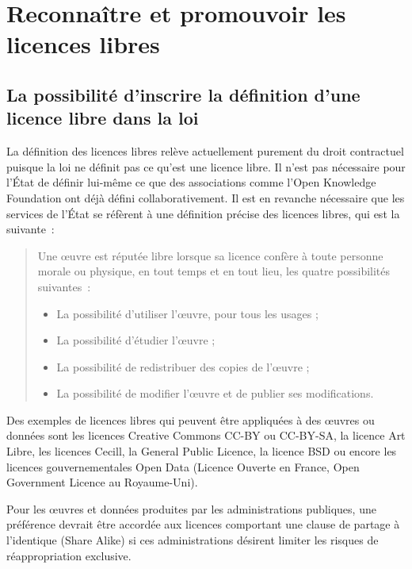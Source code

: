 \chapter{Reconnaître et promouvoir les licences libres}\label{licencelibre}

\section{La possibilité d'inscrire la définition d'une licence libre dans la loi}
La définition des licences libres relève actuellement purement du droit contractuel puisque la loi ne définit pas ce qu'est une licence libre. Il n'est pas nécessaire pour l'État de définir lui-même ce que des associations comme l'Open Knowledge Foundation ont déjà défini collaborativement. Il est en revanche nécessaire que les services de l'État se réfèrent à une définition précise des licences libres, qui est la suivante~:

\begin{quotation}
Une œuvre est réputée libre lorsque sa licence confère à toute personne morale ou physique, en tout temps et en tout lieu, les quatre possibilités suivantes~:
\begin{itemize}
\item La possibilité d'utiliser l'œuvre, pour tous les usages ;
\item La possibilité d'étudier l'œuvre ;
\item La possibilité de redistribuer des copies de l'œuvre ;
\item La possibilité de modifier l'œuvre et de publier ses modifications.
\end{itemize}
\end{quotation}

Des exemples de licences libres qui peuvent être appliquées à des œuvres ou données sont les licences Creative Commons CC-BY ou CC-BY-SA, la licence Art Libre, les licences Cecill, la General Public Licence, la licence BSD ou encore les licences gouvernementales Open Data (Licence Ouverte en France, Open Government Licence au Royaume-Uni). 

Pour les œuvres et données produites par les administrations publiques, une préférence devrait être accordée aux licences comportant une clause de partage à l'identique (Share Alike) si ces administrations désirent limiter les risques de réappropriation exclusive. 

